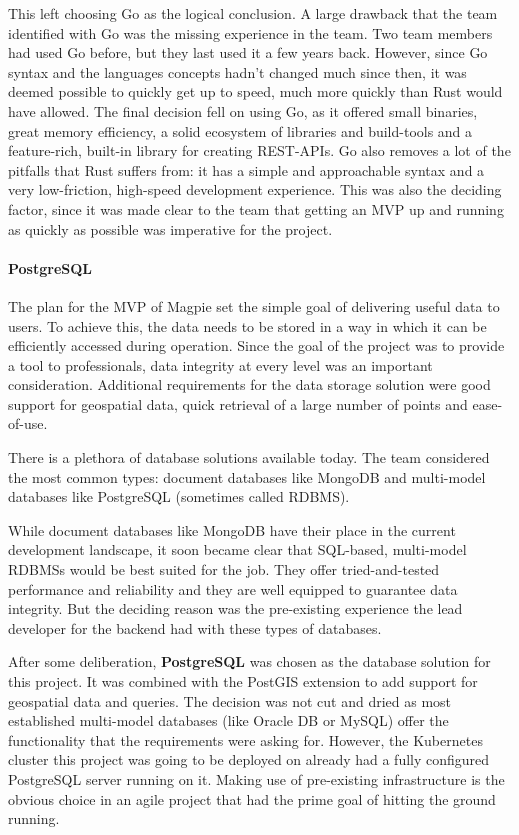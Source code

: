 This left choosing Go as the logical conclusion. A large drawback that the team
identified with Go was the missing experience in the team. Two team members had
used Go before, but they last used it a few years back. However, since Go syntax
and the languages concepts hadn't changed much since then, it was deemed
possible to quickly get up to speed, much more quickly than Rust would have
allowed. The final decision fell on using Go, as it offered small binaries,
great memory efficiency, a solid ecosystem of libraries and build-tools and a
feature-rich, built-in library for creating REST-APIs. Go also removes a lot of
the pitfalls that Rust suffers from: it has a simple and approachable syntax and
a very low-friction, high-speed development experience. This was also the
deciding factor, since it was made clear to the team that getting an MVP up and
running as quickly as possible was imperative for the project.

\paragraph{PostgreSQL}
The plan for the MVP of Magpie set the simple goal of delivering useful data to
users. To achieve this, the data needs to be stored in a way in which it can be
efficiently accessed during operation. Since the goal of the project was to
provide a tool to professionals, data integrity at every level was an important
consideration. Additional requirements for the data storage solution were good
support for geospatial data, quick retrieval of a large number of points and
ease-of-use.

There is a plethora of database solutions available today. The team considered
the most common types: document databases like MongoDB and multi-model databases
like PostgreSQL (sometimes called RDBMS).

While document databases like MongoDB have their place in the current
development landscape, it soon became clear that SQL-based, multi-model RDBMSs
would be best suited for the job. They offer tried-and-tested performance and
reliability and they are well equipped to guarantee data integrity. But the
deciding reason was the pre-existing experience the lead developer for the
backend had with these types of databases.

After some deliberation, \textbf{PostgreSQL} was chosen as the database solution for this
project. It was combined with the PostGIS extension to add support for
geospatial data and queries. The decision was not cut and dried as most
established multi-model databases (like Oracle DB or MySQL) offer the
functionality that the requirements were asking for. However, the Kubernetes
cluster this project was going to be deployed on already had a fully configured
PostgreSQL server running on it. Making use of pre-existing infrastructure is
the obvious choice in an agile project that had the prime goal of hitting the
ground running.


